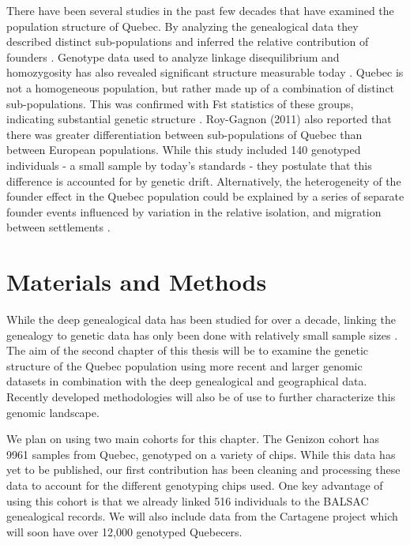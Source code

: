 \documentclass[
11pt, %
oneside, %
english, %
doublespacing, %
headsepline, %
chapterinoneline, %
]{MastersDoctoralThesis} %
\begin{document}
There have been several studies in the past few decades that have examined the population structure of Quebec.
By analyzing the genealogical data they described distinct sub-populations and inferred the relative contribution of founders \citep{Gagnon2001, Bherer2011}.
Genotype data used to analyze linkage disequilibrium and homozygosity has also revealed significant structure measurable today \citep{ Roy-Gagnon2011}.
Quebec is not a homogeneous population, but rather made up of a combination of distinct sub-populations.
This was confirmed with Fst statistics of these groups, indicating substantial genetic structure \citep{Roy-Gagnon2011}.
Roy-Gagnon (2011) also reported that there was greater differentiation between sub-populations of Quebec than between European populations.
While this study included 140 genotyped individuals - a small sample by today's standards - they postulate that this difference is accounted for by genetic drift.
Alternatively, the heterogeneity of the founder effect in the Quebec population could be explained by a series of separate founder events influenced by variation in the relative isolation, and migration between settlements \citep{Gagnon2001,Laberge2005}.

\section{Materials and Methods}

While the deep genealogical data has been studied for over a decade, linking the genealogy to genetic data has only been done with relatively small sample sizes \citep{Gagnon2001,Roy-Gagnon2011}.
The aim of the second chapter of this thesis will be to examine the genetic structure of the Quebec population using more recent and larger genomic datasets in combination with the deep genealogical and geographical data. 
Recently developed methodologies will also be of use to further characterize this genomic landscape.

We plan on using two main cohorts for this chapter. 
The Genizon cohort has 9961 samples from Quebec, genotyped on a variety of chips.
While this data has yet to be published, our first contribution has been cleaning and processing these data to account for the different genotyping chips used.
One key advantage of using this cohort is that we already linked 516 individuals to the BALSAC genealogical records.
We will also include data from the Cartagene project which will soon have over 12,000 genotyped Quebecers.
\end{document}
